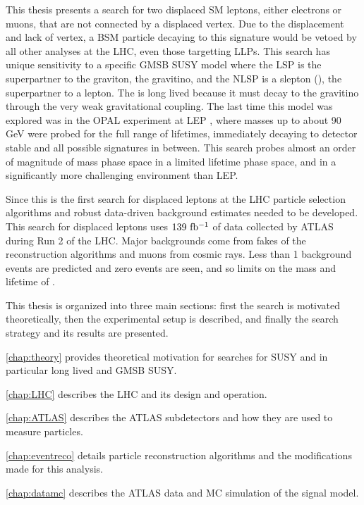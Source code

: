 This thesis presents a search for two displaced \ac{SM} leptons, either electrons or muons, that are not connected by a displaced vertex. Due to the displacement and lack of vertex, a \ac{BSM} particle decaying to this signature would be vetoed by all other analyses at the \ac{LHC}, even those targetting \acp{LLP}. This search has unique sensitivity to a specific \acf{GMSB} \acf{SUSY} model where the \acf{LSP} is the superpartner to the graviton, the gravitino, and the \acf{NLSP} is a slepton (\slep), the superpartner to a lepton. The \slep is long lived because it must decay to the gravitino through the very weak gravitational coupling. The last time this model was explored was in the OPAL experiment at \acf{LEP} \cite{opal}, where masses up to about 90 GeV were probed for the full range of lifetimes, immediately decaying to detector stable and all possible signatures in between. This search probes almost an order of magnitude of mass phase space in a limited lifetime phase space, and in a significantly more challenging environment than \ac{LEP}.

Since this is the first search for displaced leptons at the \ac{LHC} particle selection algorithms and robust data-driven background estimates needed to be developed. This search for displaced leptons uses $139~ \mbox{fb\(^{-1}\)}$ of data collected by \ac{ATLAS} during Run 2 of the \ac{LHC}. Major backgrounds come from fakes of the reconstruction algorithms and muons from cosmic rays. Less than 1 background events are predicted and zero events are seen, and so limits on the mass and lifetime of \slep. 

This thesis is organized into three main sections: first the search is motivated theoretically, then the experimental setup is described, and finally the search strategy and its results are presented.

\autoref{chap:theory} provides theoretical motivation for searches for \ac{SUSY} and in particular long lived and \ac{GMSB} \ac{SUSY}.

\autoref{chap:LHC} describes the \ac{LHC} and its design and operation.

\autoref{chap:ATLAS} describes the \ac{ATLAS} subdetectors and how they are used to measure particles.

\autoref{chap:eventreco} details particle reconstruction algorithms and the modifications made for this analysis.

\autoref{chap:datamc} describes the \ac{ATLAS} data and \acf{MC} simulation of the signal model.

